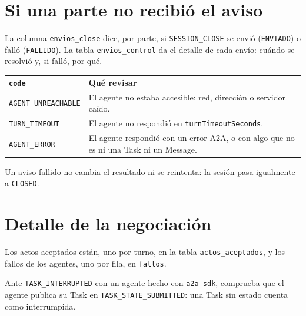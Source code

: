 \section{Si una parte no recibió el aviso}

La columna \texttt{envios\_close} dice, por parte, si \texttt{SESSION\_CLOSE} se envió (\texttt{ENVIADO}) o falló (\texttt{FALLIDO}). La tabla \texttt{envios\_control} da el detalle de cada envío: cuándo se resolvió y, si falló, por qué.

\begin{tabular}{lp{9.5cm}}
  \textbf{\texttt{code}} & \textbf{Qué revisar} \\
  \texttt{AGENT\_UNREACHABLE} & El agente no estaba accesible: red, dirección o servidor caído. \\
  \texttt{TURN\_TIMEOUT} & El agente no respondió en \texttt{turnTimeoutSeconds}. \\
  \texttt{AGENT\_ERROR} & El agente respondió con un error A2A, o con algo que no es ni una Task ni un Message. \\
\end{tabular}

Un aviso fallido no cambia el resultado ni se reintenta: la sesión pasa igualmente a \texttt{CLOSED}.

\section{Detalle de la negociación}

Los actos aceptados están, uno por turno, en la tabla \texttt{actos\_aceptados}, y los fallos de los agentes, uno por fila, en \texttt{fallos}.

Ante \texttt{TASK\_INTERRUPTED} con un agente hecho con \texttt{a2a-sdk}, comprueba que el agente publica su Task en \texttt{TASK\_STATE\_SUBMITTED}: una Task sin estado cuenta como interrumpida.
